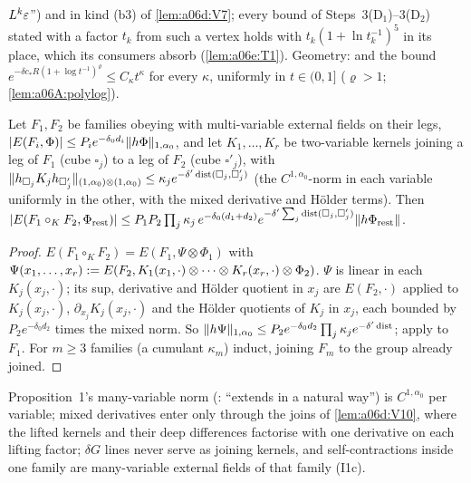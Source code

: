 $L^k\varepsilon$'') and in kind (b3) of \cref{lem:a06d:V7}; every bound of Steps~3(D$_1$)--3(D$_2$) stated with a factor $t_k$ from such a vertex holds with $t_k(1+\ln t_k^{-1})^5$ in its place, which its consumers absorb (\cref{lem:a06e:T1}). Geometry: \cite[(2.7)--(2.8)]{Ba2} and the bound $e^{-\delta c_*R(1+\log t^{-1})^\varrho}\le C_\kappa t^\kappa$ for every $\kappa$, uniformly in $t\in(0,1]$ ($\varrho>1$; \cref{lem:a06A:polylog}).

\begin{lemma}\label{lem:a06d:V10}
Let $F_1,F_2$ be families obeying \cite[(1.33)]{Ba3} with multi-variable external fields on their legs, $|E(F_i,\Phi)|\le P_ie^{-\delta_0d_i}\lVert h\Phi\rVert_{1,\alpha_0}$, and let $K_1,\dots,K_r$ be two-variable kernels joining a leg of $F_1$ (cube $\square_j$) to a leg of $F_2$ (cube $\square'_j$), with $\lVert h_{\square_j}K_jh_{\square'_j}\rVert_{(1,\alpha_0)\otimes(1,\alpha_0)}\le\kappa_je^{-\delta'\operatorname{dist}(\square_j,\square'_j)}$ (the $C^{1,\alpha_0}$-norm in each variable uniformly in the other, with the mixed derivative and H\"older terms). Then $|E(F_1\circ_KF_2,\Phi_{\mathrm{rest}})|\le P_1P_2\prod_j\kappa_j\,e^{-\delta_0(d_1+d_2)}e^{-\delta'\sum_j\operatorname{dist}(\square_j,\square'_j)}\lVert h\Phi_{\mathrm{rest}}\rVert$.
\end{lemma}

\begin{proof}
$E(F_1\circ_KF_2)=E(F_1,\Psi\otimes\Phi_1)$ with $\Psi(x_1,\dots,x_r):= E(F_2,K_1(x_1,\cdot)\otimes\dots\otimes K_r(x_r,\cdot)\otimes\Phi_2)$. $\Psi$ is linear in each $K_j(x_j,\cdot)$; its sup, derivative and H\"older quotient in $x_j$ are $E(F_2,\cdot)$ applied to $K_j(x_j,\cdot)$, $\partial_{x_j}K_j(x_j,\cdot)$ and the H\"older quotients of $K_j$ in $x_j$, each bounded by $P_2e^{-\delta_0d_2}$ times the mixed norm. So $\lVert h\Psi\rVert_{1,\alpha_0}\le P_2e^{-\delta_0d_2}\prod_j\kappa_je^{-\delta'\operatorname{dist}}$; apply \cite[(1.33)]{Ba3} to $F_1$. For $m\ge3$ families (a cumulant $\kappa_m$) induct, joining $F_m$ to the group already joined.
\end{proof}

Proposition~1's many-variable norm (\cite[p.~420]{Ba3}: \cite[(1.32)]{Ba3} ``extends in a natural way'') is $C^{1,\alpha_0}$ per variable; mixed derivatives enter only through the joins of \cref{lem:a06d:V10}, where the lifted kernels and their deep differences factorise with one derivative on each lifting factor; $\delta G$ lines never serve as joining kernels, and self-contractions inside one family are many-variable external fields of that family (I1c).

